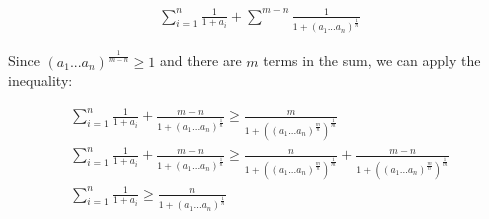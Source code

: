 \documentclass[11pt]{article}
\begin{document}
\begin{gather}
  \sum_{i=1}^{n} \frac{1}{1 + a_i} + \sum^{m-n} \frac{1}{1 + (a_1...a_n)^{\frac{1}{n}}} 
\end{gather}

Since $(a_1...a_n)^{\frac{1}{m-n}} \geq 1$ and there are $m$ terms in the sum, we can apply the inequality:

\begin{gather}
\sum_{i=1}^{n} \frac{1}{1 + a_i} + \frac{m-n}{1 + (a_1...a_n)^{\frac{1}{n}}} \geq \frac{m}{1 + ((a_1...a_n)^{\frac{m}{n}})^{\frac{1}{m}}} \\ 
\sum_{i=1}^{n} \frac{1}{1 + a_i} + \frac{m-n}{1 + (a_1...a_n)^{\frac{1}{n}}} \geq \frac{n}{1 + ((a_1...a_n)^{\frac{m}{n}})^{\frac{1}{m}}} + \frac{m-n}{1 + ((a_1...a_n)^{\frac{m}{n}})^{\frac{1}{m}}} \\
\sum_{i=1}^{n} \frac{1}{1 + a_i} \geq \frac{n}{1 + (a_1...a_n)^{\frac{1}{n}}}
\end{gather}
\end{document}
